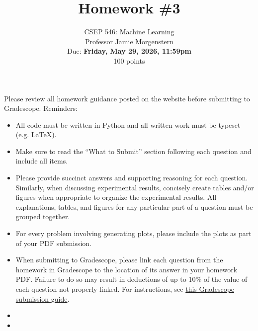 \documentclass{article}
\begin{document}
\setcounter{aprob}{0}
\title{Homework \#3}
\author{
    \normalsize{CSEP 546: Machine Learning}\\
    \normalsize{Professor Jamie Morgenstern}\\
    \normalsize{Due: \textbf{Friday, May 29, 2026, 11:59pm}}\\
    \normalsize{100 points}
}
\date{{}}
\maketitle

\noindent Please review all homework guidance posted on the website before submitting to Gradescope. Reminders:
\begin{itemize}
    \item All code must be written in Python and all written work must be typeset (e.g. \LaTeX{}).
    \item Make sure to read the ``What to Submit'' section following each question and include all items.
    \item Please provide succinct answers and supporting reasoning for each question. Similarly, when discussing experimental results, concisely create tables and/or figures when appropriate to organize the experimental results. All explanations, tables, and figures for any particular part of a question must be grouped together.
    \item For every problem involving generating plots, please include the plots as part of your PDF submission.
    \item When submitting to Gradescope, please link each question from the homework in Gradescope to the location of its answer in your homework PDF. Failure to do so may result in deductions of up to 10\% of the value of each question not properly linked. For instructions, see \href{https://www.gradescope.com/get_started#student-submission}{this Gradescope submission guide}.
    \item {}
    \item {}
\end{itemize}
\end{document}
